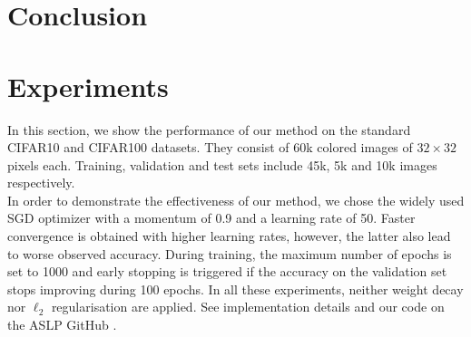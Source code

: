 

\section{Conclusion}


  \section{Experiments}\label{sec:experiments}
  
  In this section, we show the performance of our method on the standard CIFAR10
  and CIFAR100 datasets.   They consist of  60k  colored images of $32\times 32$
  pixels each.  Training,  validation and test sets  include  45k,  5k and 10k
  images respectively.  \\  In order to demonstrate the effectiveness of our
  method, we chose the widely used SGD optimizer with a momentum of  0.9  and a
  learning rate of 50.    Faster convergence is obtained with higher learning
  rates,   however,  the latter also lead  to worse observed accuracy.   During
  training,  the maximum number of epochs is set to 1000 and early stopping is
  triggered  if the accuracy on the validation set stops improving during 100
  epochs.   In all these experiments, neither weight decay nor $\ell_2$
  regularisation are applied. See implementation details and our code on the ASLP GitHub
  \cite{Dupont2022}.

